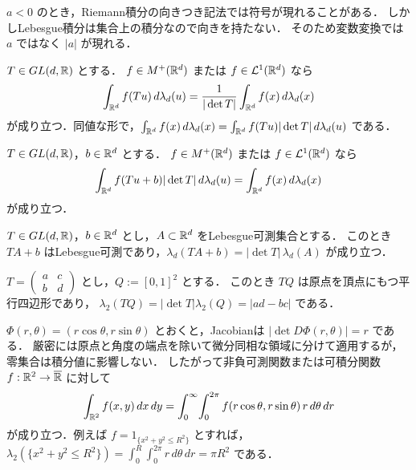 \begin{remark}[向きと絶対値]
$a<0$ のとき，Riemann積分の向きつき記法では符号が現れることがある．
しかしLebesgue積分は集合上の積分なので向きを持たない．
そのため変数変換では $a$ ではなく $|a|$ が現れる．
\end{remark}

\begin{theorem}[線形変数変換]\label{thm:linear-change-of-variables}
$T\in GL(d,\mathbb R)$ とする．
$f\in M^+(\mathbb R^d)$ または $f\in\mathcal L^1(\mathbb R^d)$ なら
\[
\int_{\mathbb R^d} f(Tu)\,d\lambda_d(u)=\frac1{|\det T|}\int_{\mathbb R^d}f(x)\,d\lambda_d(x)
\]
が成り立つ．同値な形で，$\int_{\mathbb R^d}f(x)\,d\lambda_d(x)=\int_{\mathbb R^d}f(Tu)|\det T|\,d\lambda_d(u)$ である．
\end{theorem}

\begin{corollary}\label{cor:affine-change-of-variables}
$T\in GL(d,\mathbb R)$，$b\in\mathbb R^d$ とする．
$f\in M^+(\mathbb R^d)$ または $f\in\mathcal L^1(\mathbb R^d)$ なら
\[
\int_{\mathbb R^d} f(Tu+b)|\det T|\,d\lambda_d(u)=\int_{\mathbb R^d}f(x)\,d\lambda_d(x)
\]
が成り立つ．
\end{corollary}

\begin{corollary}[集合の体積の変換]\label{cor:volume-under-affine-map}
$T\in GL(d,\mathbb R)$，$b\in\mathbb R^d$ とし，$A\subset\mathbb R^d$ をLebesgue可測集合とする．
このとき $TA+b$ はLebesgue可測であり，$\lambda_d(TA+b)=|\det T|\,\lambda_d(A)$ が成り立つ．
\end{corollary}

\begin{example}[平行四辺形の面積]\label{ex:parallelogram-area}
$T=\begin{pmatrix}a&c\\ b&d\end{pmatrix}$ とし，$Q:=[0,1]^2$ とする．
このとき $TQ$ は原点を頂点にもつ平行四辺形であり，
$\lambda_2(TQ)=|\det T|\lambda_2(Q)=|ad-bc|$ である．
\end{example}

\begin{example}[極座標]\label{ex:polar-coordinates}
$\Phi(r,\theta)=(r\cos\theta,r\sin\theta)$ とおくと，Jacobianは
$|\det D\Phi(r,\theta)|=r$ である．
厳密には原点と角度の端点を除いて微分同相な領域に分けて適用するが，零集合は積分値に影響しない．
したがって非負可測関数または可積分関数 $f:\mathbb R^2\to\overline{\mathbb R}$ に対して
\[
\int_{\mathbb R^2}f(x,y)\,dx\,dy=\int_0^\infty\!\int_0^{2\pi} f(r\cos\theta,r\sin\theta)\,r\,d\theta\,dr
\]
が成り立つ．例えば $f=1_{\{x^2+y^2\le R^2\}}$ とすれば，
$\lambda_2(\{x^2+y^2\le R^2\})=\int_0^R\int_0^{2\pi}r\,d\theta\,dr=\pi R^2$ である．
\end{example}

